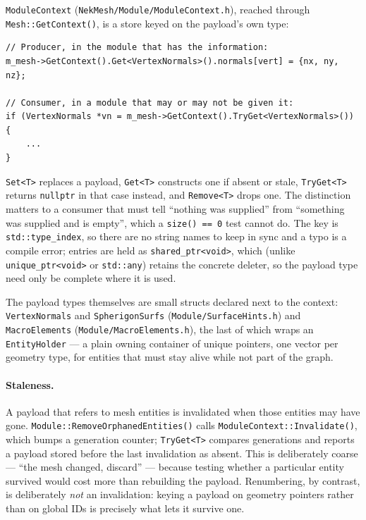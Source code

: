 \texttt{ModuleContext} (\texttt{NekMesh/Module/ModuleContext.h}),
reached through \texttt{Mesh::GetContext()}, is a store keyed on the
payload's own type:

\begin{lstlisting}[style=BashInputStyle]
// Producer, in the module that has the information:
m_mesh->GetContext().Get<VertexNormals>().normals[vert] = {nx, ny, nz};

// Consumer, in a module that may or may not be given it:
if (VertexNormals *vn = m_mesh->GetContext().TryGet<VertexNormals>())
{
    ...
}
\end{lstlisting}

\noindent \texttt{Set<T>} replaces a payload, \texttt{Get<T>}
constructs one if absent or stale, \texttt{TryGet<T>} returns
\texttt{nullptr} in that case instead, and \texttt{Remove<T>} drops
one. The distinction matters to a consumer that must tell ``nothing was
supplied'' from ``something was supplied and is empty'', which a
\texttt{size() == 0} test cannot do. The key is
\texttt{std::type\_index}, so there are no string names
to keep in sync and a typo is a compile error; entries are held as
\texttt{shared\_ptr<void>}, which (unlike \texttt{unique\_ptr<void>} or
\texttt{std::any}) retains the concrete deleter, so the payload type
need only be complete where it is used.

The payload types themselves are small structs declared next to the
context: \texttt{VertexNormals} and \texttt{SpherigonSurfs}
(\texttt{Module/SurfaceHints.h}) and \texttt{MacroElements}
(\texttt{Module/MacroElements.h}), the last of which wraps an
\texttt{EntityHolder} --- a plain owning container of unique pointers,
one vector per geometry type, for entities that must stay alive while
not part of the graph.

\paragraph{Staleness.} A payload that refers to mesh entities is
invalidated when those entities may have gone.
\texttt{Module::RemoveOrphanedEntities()} calls
\texttt{ModuleContext::Invalidate()}, which bumps a generation counter;
\texttt{TryGet<T>} compares generations and reports a payload stored
before the last invalidation as absent. This is deliberately coarse ---
``the mesh changed, discard'' --- because testing whether a particular
entity survived would cost more than rebuilding the payload.
Renumbering, by contrast, is deliberately \textit{not} an invalidation:
keying a payload on geometry pointers rather than on global IDs is
precisely what lets it survive one.

